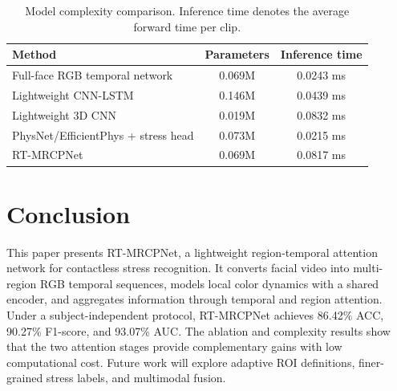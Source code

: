 \documentclass[runningheads]{llncs}
\begin{document}
\begin{table}
\caption{Model complexity comparison. Inference time denotes the average forward time per clip.}
\label{tab:complexity}
\centering
\begin{tabular}{lcc}
\toprule
Method & Parameters & Inference time \\
\midrule
Full-face RGB temporal network & 0.069M & 0.0243 ms \\
Lightweight CNN-LSTM & 0.146M & 0.0439 ms \\
Lightweight 3D CNN & 0.019M & 0.0832 ms \\
PhysNet/EfficientPhys + stress head & 0.073M & 0.0215 ms \\
RT-MRCPNet & 0.069M & 0.0817 ms \\
\bottomrule
\end{tabular}
\end{table}

\section{Conclusion}

This paper presents RT-MRCPNet, a lightweight region-temporal attention network for contactless stress recognition. It converts facial video into multi-region RGB temporal sequences, models local color dynamics with a shared encoder, and aggregates information through temporal and region attention. Under a subject-independent protocol, RT-MRCPNet achieves 86.42\% ACC, 90.27\% F1-score, and 93.07\% AUC. The ablation and complexity results show that the two attention stages provide complementary gains with low computational cost. Future work will explore adaptive ROI definitions, finer-grained stress labels, and multimodal fusion.

\begingroup


\endgroup
\end{document}
